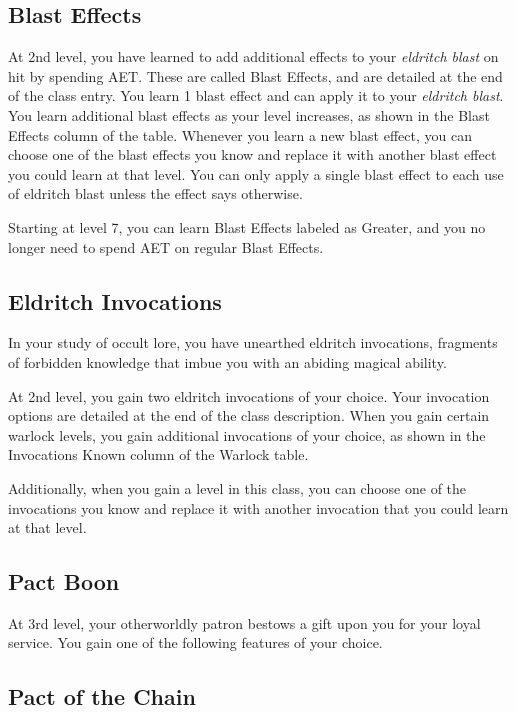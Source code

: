 \subsection{Blast Effects}

At 2nd level, you have learned to add additional effects to your \textit{eldritch blast} on hit by spending AET. These are called Blast Effects, and are detailed at the end of the class entry. You learn 1 blast effect and can apply it to your \textit{eldritch blast}. You learn additional blast effects as your level increases, as shown in the Blast Effects column of the  table. Whenever you learn a new blast effect, you can choose one of the blast effects you know and replace it with another blast effect you could learn at that level. You can only apply a single blast effect to each use of eldritch blast unless the effect says otherwise.

Starting at level 7, you can learn Blast Effects labeled as Greater, and you no longer need to spend AET on regular Blast Effects. 

\subsection{Eldritch Invocations}

In your study of occult lore, you have unearthed eldritch invocations, fragments of forbidden knowledge that imbue you with an abiding magical ability.

At 2nd level, you gain two eldritch invocations of your choice. Your invocation options are detailed at the end of the class description. When you gain certain warlock levels, you gain additional invocations of your choice, as shown in the Invocations Known column of the Warlock table.

Additionally, when you gain a level in this class, you can choose one of the invocations you know and replace it with another invocation that you could learn at that level.

\subsection{Pact Boon}

At 3rd level, your otherworldly patron bestows a gift upon you for your loyal service. You gain one of the following features of your choice.

\subsection{Pact of the Chain}

